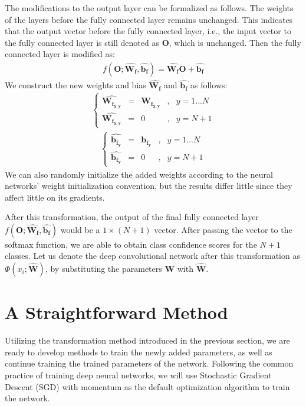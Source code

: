 The modifications to the output layer can be formalized as follows. The weights of the layers before the fully connected layer remains unchanged. This indicates that the output vector before the fully connected layer, i.e., the input vector to the fully connected layer is still denoted as $\mathbf{O}$, which is unchanged. Then the fully connected layer is modified as:
\begin{align}
f(\mathbf{O}; \hat{\mathbf{W_f}}, \hat{\mathbf{b_f}}) =  \hat{\mathbf{W_f}}\mathbf{O} + \hat{\mathbf{b_f}}
\end{align}
We construct the new weights and bias $\hat{\mathbf{W_f}}$ and $\hat{\mathbf{b_f}}$ as follows:
\begin{align}
\left\{
	\begin{aligned}
	\hat{\mathbf{W_{f_{x,y}}}} & = & \mathbf{W_{f_{x,y}}}& ,& y = 1...N\\
	\hat{\mathbf{W_{f_{x,y}}}} & = & 0&,& y = N+1	
	\end{aligned}
\right.
\end{align}
\begin{align}
\left\{
\begin{aligned}
\hat{\mathbf{b_{f_{y}}}} & = & \mathbf{b_{f_{y}}}& ,& y = 1...N\\
\hat{\mathbf{b_{f_{y}}}} & = & 0&,& y = N+1	
\end{aligned}
\right.
\end{align}
We can also randomly initialize the added weights according to the neural networks' weight initialization convention, but the results differ little since they affect little on its gradients.

After this transformation, the output of the final fully connected layer $f(\mathbf{O}; \hat{\mathbf{W_f}}, \hat{\mathbf{b_f}})$ would be a $1\times (N+1)$ vector. After passing the vector to the softmax function, we are able to obtain class confidence scores for the $N+1$ classes. Let us denote the deep convolutional network after this transformation as $\Phi(x_i; \hat{\mathbf{W}})$, by substituting the parameters $\mathbf{W}$ with $\hat{\mathbf{W}}$.


\section{A Straightforward Method}

Utilizing the transformation method introduced in the previous section, we are ready to develop methods to train the newly added parameters, as well as continue training the trained parameters of the network. Following the common practice of training deep neural networks, we will use Stochastic Gradient Descent\cite{he2015deep} (SGD) with momentum\cite{sutskever2013importance} as the default optimization algorithm to train the network.

